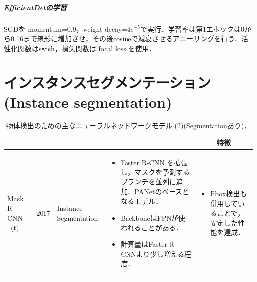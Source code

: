 \documentclass[twocolumn]{jsarticle} %
\begin{document}
\subparagraph{EfficientDetの学習}
SGDを momentum=0.9，weight decay=$4e^{-5}$で実行．学習率は第1エポックは0から0.16まで線形に増加させ，その後cosineで減衰させるアニーリングを行う．活性化関数はswish，損失関数は focal loss を使用．


\section{インスタンスセグメンテーション(Instance segmentation)}
\begin{table}
    \caption{物体検出のための主なニューラルネットワークモデル (2)(Segmentationあり)．}
    \label{tbl-cheat2}
    \begin{center}
        \setlength{\tabcolsep}{3pt}
        \footnotesize
        \begin{tabularx}{\linewidth}{XcXp{7cm}X} \toprule
            \centering{モデル名称[文献]} & \centering{発行年} & \centering{用途} & \centering{概要} & \multicolumn{1}{c}{特徴} \\ \midrule

            Mask R-CNN \cite{HGDG17} \ (t)\footnote[2] & 2017 & Instance Segmentation & 
            \begin{itemize}
                \vspace{-0.7\baselineskip}
                \setlength{\leftskip}{-3mm}
                \item Faster R-CNN を拡張し，マスクを予測するブランチを並列に追加．PANetのベースとなるモデル．
                \item BackboneはFPNが使われることがある．
                \item 計算量はFaster R-CNNより少し増える程度．
            \end{itemize}
            &
            \begin{itemize}
                \vspace{-0.7\baselineskip}
                \setlength{\leftskip}{-3mm}
                \item Bbox検出も併用していることで，安定した性能を達成．
            \end{itemize}
            \\


\end{tabularx}
\end{center}
\end{table}
\end{document}
